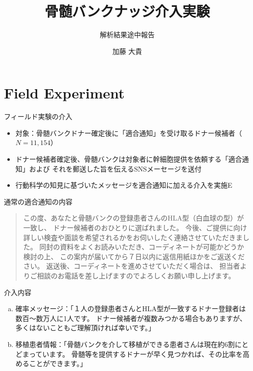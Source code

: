 \documentclass[
      aspectratio=169,
        12pt,
    ]{beamer}
\title{骨髄バンクナッジ介入実験}
\subtitle{解析結果途中報告}
\author{%
        加藤 大貴\inst{1}
    \and
      }
\providecommand{\tightlist}{%
  \setlength{\itemsep}{0pt}\setlength{\parskip}{0pt}}
\begin{document}
\frame{\titlepage}


\hypertarget{field-experiment}{%
\section{Field Experiment}\label{field-experiment}}

\begin{frame}{フィールド実験の介入}
\protect\hypertarget{ux30d5ux30a3ux30fcux30ebux30c9ux5b9fux9a13ux306eux4ecbux5165}{}
\begin{itemize}
\tightlist
\item
  対象：骨髄バンクドナー確定後に「適合通知」を受け取るドナー候補者（\(N = 11,154\)）
\item
  ドナー候補者確定後、骨髄バンクは対象者に幹細胞提供を依頼する「適合通知」および
  それを郵送した旨を伝えるSNSメーセージを送付
\item
  行動科学の知見に基づいたメッセージを適合通知に加える介入を実施E
\end{itemize}
\end{frame}

\begin{frame}{通常の適合通知の内容}
\protect\hypertarget{ux901aux5e38ux306eux9069ux5408ux901aux77e5ux306eux5185ux5bb9}{}
\begin{quote}
この度、あなたと骨髄バンクの登録患者さんのHLA型（白血球の型）が一致し、
ドナー候補者のおひとりに選ばれました。
今後、ご提供に向け詳しい検査や面談を希望されるかをお伺いしたく連絡させていただきました。
同封の資料をよくお読みいただき、コーディネートが可能かどうか検討の上、
この案内が届いてから７日以内に返信用紙ほかをご返送ください。
返送後、コーディネートを進めさせていただく場合は、
担当者よりご相談のお電話を差し上げますのでよろしくお願い申し上げます。
\end{quote}
\end{frame}

\begin{frame}{介入内容}
\protect\hypertarget{ux4ecbux5165ux5185ux5bb9}{}
\begin{enumerate}
[a.]
\tightlist
\item
  確率メッセージ：「１人の登録患者さんとHLA型が一致するドナー登録者は数百〜数万人に1人です。
  ドナー候補者が複数みつかる場合もありますが、多くはないこともご理解頂ければ幸いです。」
\item
  移植患者情報：「骨髄バンクを介して移植ができる患者さんは現在約6割にとどまっています。
  骨髄等を提供するドナーが早く見つかれば、その比率を高めることができます。」
\end{enumerate}
\end{frame}
\end{document}
